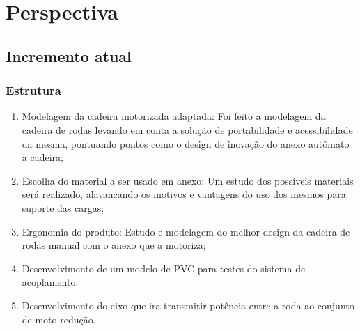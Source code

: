 \chapter[Perspectiva]{Perspectiva}

\section{Incremento atual}
  \subsection{Estrutura}
    \begin{enumerate}
      \item Modelagem da cadeira motorizada adaptada: Foi feito a modelagem da cadeira de rodas levando em conta a solução de portabilidade e acessibilidade da mesma, pontuando pontos como o design de inovação do anexo autômato a cadeira;
      \item Escolha do material a ser usado em anexo: Um estudo dos possíveis materiais será realizado, alavancando os motivos e vantagens do uso dos mesmos para suporte das cargas;

      \item Ergonomia do produto: Estudo e modelagem do melhor design da cadeira de rodas manual com o anexo que a motoriza;

      \item Desenvolvimento de um modelo de PVC para testes do sistema de acoplamento;

      \item Desenvolvimento do eixo que ira transmitir potência entre a roda ao conjunto de moto-redução.

    \end{enumerate}
